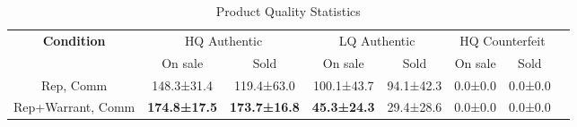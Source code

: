\begin{table}[t]
    \centering
    \caption{Product Quality Statistics}
    \label{tab:rq3_product_quality}
    \begin{tabular}{cccccccc}
    \toprule
    \textbf{Condition} & \multicolumn{2}{c}{HQ Authentic} & \multicolumn{2}{c}{LQ Authentic} & \multicolumn{2}{c}{HQ Counterfeit} \\
     & On sale & Sold & On sale & Sold & On sale & Sold \\
    \midrule
    Rep, Comm & 148.3±31.4 & 119.4±63.0 & 100.1±43.7 & 94.1±42.3 & 0.0±0.0 & 0.0±0.0 \\
    Rep+Warrant, Comm & \textbf{174.8±17.5} & \textbf{173.7±16.8} & \textbf{45.3±24.3} & 29.4±28.6 & 0.0±0.0 & 0.0±0.0 \\
    \bottomrule
    \end{tabular}
\end{table}
